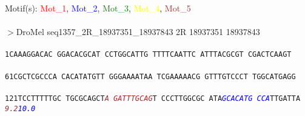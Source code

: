 \documentclass[11pt,twoside,reqno,a4paper]{article}
\begin{document}
\noindent
\newlength{\charwidth}Motif(s): \textcolor{Red}{Mot\_1}, \textcolor{Blue}{Mot\_2}, \textcolor{Green}{Mot\_3}, \textcolor{Yellow}{Mot\_4}, \textcolor{Brown}{Mot\_5}\\
\\
$>$DroMel	seq1357\_2R\_18937351\_18937843	2R	18937351	18937843 \\
 \\
\texttt{1\hspace*{3\charwidth}CAAAGGACAC	GGACACGCAT	CCTGGCATTG	TTTTCAATTC	ATTTACGCGT	CGACTCAAGT	\\
\hspace*{4\charwidth}\hspace*{1\charwidth}\hspace*{1\charwidth}\hspace*{1\charwidth}\hspace*{1\charwidth}\hspace*{1\charwidth}\hspace*{1\charwidth}\\
61\hspace*{2\charwidth}CGCTCGCCCA	CACATATGTT	GGGAAAATAA	TCGAAAAACG	GTTTGTCCCT	TGGCATGAGG	\\
\hspace*{4\charwidth}\hspace*{1\charwidth}\hspace*{1\charwidth}\hspace*{1\charwidth}\hspace*{1\charwidth}\hspace*{1\charwidth}\hspace*{1\charwidth}\\
121\hspace*{1\charwidth}TCCTTTTTGC	TGCGCAGCT\textit{\textcolor{Brown}{A}}	\textit{\textcolor{Brown}{G}}\textit{\textcolor{Brown}{A}}\textit{\textcolor{Brown}{T}}\textit{\textcolor{Brown}{T}}\textit{\textcolor{Brown}{T}}\textit{\textcolor{Brown}{G}}\textit{\textcolor{Brown}{C}}\textit{\textcolor{Brown}{A}}\textit{\textcolor{Brown}{G}}T	CCCTTGGCGC	ATA\textit{\textcolor{Blue}{G}}\textit{\textcolor{Blue}{C}}\textit{\textcolor{Blue}{A}}\textit{\textcolor{Blue}{C}}\textit{\textcolor{Blue}{A}}\textit{\textcolor{Blue}{T}}\textit{\textcolor{Blue}{G}}	\textit{\textcolor{Blue}{C}}\textit{\textcolor{Blue}{C}}\textit{\textcolor{Blue}{A}}TTGATTA	\\
\hspace*{4\charwidth}\hspace*{1\charwidth}\hspace*{19\charwidth}\textit{\textcolor{Brown}{9.2}}\hspace*{1\charwidth}\hspace*{1\charwidth}\hspace*{1\charwidth}\hspace*{21\charwidth}\textit{\textcolor{Blue}{10.0}}\hspace*{1\charwidth}\hspace*{1\charwidth}\\
}
\end{document}
